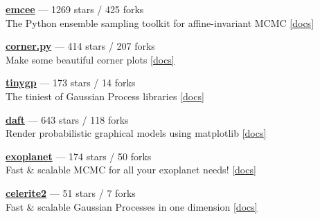 \item \href{https://github.com/dfm/emcee}{{\bf emcee}} --- 1269 stars / 425 forks \\
The Python ensemble sampling toolkit for affine-invariant MCMC \href{https://emcee.readthedocs.io}{[docs]}

\item \href{https://github.com/dfm/corner.py}{{\bf corner.py}} --- 414 stars / 207 forks \\
Make some beautiful corner plots \href{http://corner.readthedocs.io}{[docs]}

\item \href{https://github.com/dfm/tinygp}{{\bf tinygp}} --- 173 stars / 14 forks \\
The tiniest of Gaussian Process libraries \href{https://tinygp.readthedocs.io}{[docs]}

\item \href{https://github.com/daft-dev/daft}{{\bf daft}} --- 643 stars / 118 forks \\
Render probabilistic graphical models using matplotlib \href{https://docs.daft-pgm.org}{[docs]}

\item \href{https://github.com/exoplanet-dev/exoplanet}{{\bf exoplanet}} --- 174 stars / 50 forks \\
Fast {\&} scalable MCMC for all your exoplanet needs!  \href{https://docs.exoplanet.codes}{[docs]}

\item \href{https://github.com/exoplanet-dev/celerite2}{{\bf celerite2}} --- 51 stars / 7 forks \\
Fast {\&} scalable Gaussian Processes in one dimension \href{https://celerite2.readthedocs.io}{[docs]}